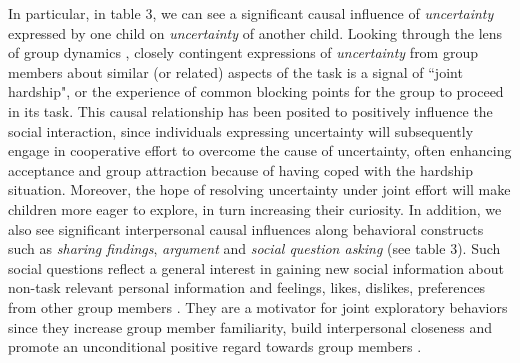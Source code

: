 \documentclass{llncs}
\begin{document}
In particular, in table 3, we can see a significant causal influence of {\em uncertainty} expressed by one child on {\em uncertainty} of another child. Looking through the lens of group dynamics \cite{dornyei2003group}, closely contingent expressions of {\em uncertainty} from group members about similar (or related) aspects of the task is a signal of ``joint hardship", or the experience of common blocking points for the group to proceed in its task. This causal relationship has been posited to positively influence the social interaction, since individuals expressing uncertainty will subsequently engage in cooperative effort to overcome the cause of uncertainty, often enhancing acceptance and group attraction because of having coped with the hardship situation. Moreover, the hope of resolving uncertainty under joint effort will make children more eager to explore, in turn increasing their curiosity. In addition, we also see significant interpersonal causal influences along behavioral constructs such as {\em sharing findings}, {\em argument} and {\em social question asking} (see table 3). Such social questions reflect a general interest in gaining new social information about non-task relevant personal information and feelings, likes, dislikes, preferences from other group members \cite{litman2007dimensionality}. They are a motivator for joint exploratory behaviors since they increase group member familiarity, build interpersonal closeness and promote an unconditional positive regard towards group members \cite{dornyei2003group,rogers1983freedom}.
\end{document}
